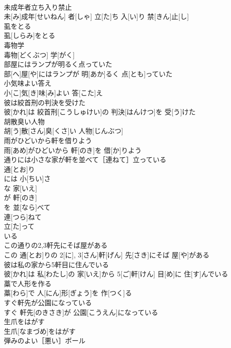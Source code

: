 \documentclass[8pt]{extreport}
\begin{document}
\begin{CJK}{UTF8}{min}
\\	未成年者立ち入り禁止	
\\	未[み]成年[せいねん] 者[しゃ] 立[た]ち 入[い]り 禁[きん]止[し]
\\	虱をとる	
\\	虱[しらみ]をとる
\\	毒物学	
\\	毒物[どくぶつ] 学[がく]
\\	部屋にはランプが明るく点っていた	
\\	部[へ]屋[や]にはランプが 明[あか]るく 点[とも]っていた
\\	小気味よい答え	
\\	小[こ]気[き]味[み]よい 答[こた]え
\\	彼は絞首刑の判決を受けた	
\\	彼[かれ]は 絞首刑[こうしゅけい]の 判決[はんけつ]を 受[う]けた
\\	胡散臭い人物	
\\	胡[う]散[さん]臭[くさ]い 人物[じんぶつ]
\\	雨がひどいから軒を借りよう	
\\	雨[あめ]がひどいから 軒[のき]を 借[か]りよう
\\	通りには小さな家が軒を並べて［連ねて］立っている	
\\	通[とお]り 
\\	には 小[ちい]さ 
\\	な 家[いえ]
\\	が 軒[のき]
\\	を 並[なら]べて 
\\	連[つら]ねて 
\\	立[た]って 
\\	いる 
\\	この通りの2,3軒先にそば屋がある	
\\	この 通[とお]りの 2[に], 3[さん]軒[げん] 先[さき]にそば 屋[や]がある
\\	彼は私の家から5軒目に住んでいる	
\\	彼[かれ]は 私[わたし]の 家[いえ]から 5[ご]軒[けん] 目[め]に 住[す]んでいる
\\	藁で人形を作る	
\\	藁[わら]で 人[にん]形[ぎょう]を 作[つく]る
\\	すぐ軒先が公園になっている	
\\	すぐ 軒先[のきさき]が 公園[こうえん]になっている
\\	生爪をはがす	
\\	生爪[なまづめ]をはがす
\\	弾みのよい［悪い］ボール	

\end{CJK}
\end{document}
